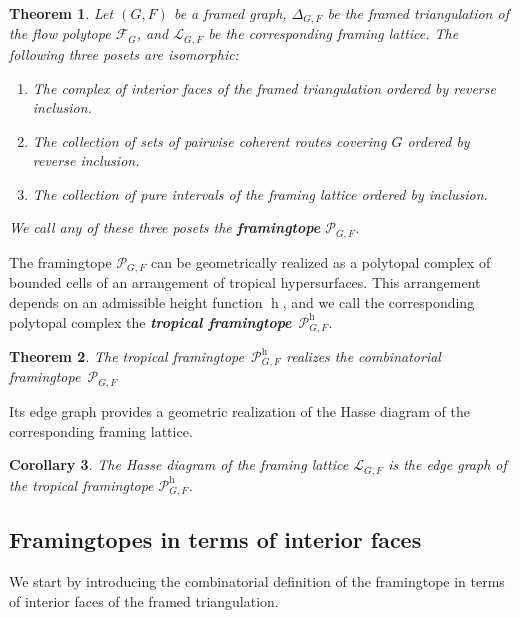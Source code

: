 \documentclass[12pt, reqno]{amsart}
\newcommand{\defn}[1]{{\color{blue!50!black}\textbf{\emph{#1}}}}
\newcommand{\h}{\operatorname{h}}
\theoremstyle{plain}
\newtheorem{theorem}{Theorem}[section]
\newtheorem{corollary}[theorem]{Corollary}
\theoremstyle{definition}
\numberwithin{equation}{section}
\begin{document}
\begin{theorem}
    \label{thm.three_equivalent_definitions}
    Let $(G,F)$ be a framed graph, $\Delta_{G,F}$ be the framed triangulation of the flow polytope $\mathcal{F}_G$, and $\mathscr{L}_{G,F}$ be the corresponding framing lattice. The following three posets are isomorphic:
    \begin{enumerate}
        \item The complex of interior faces of the framed triangulation ordered by reverse inclusion. \label{def_framingtope_one}
        \item The collection of sets of pairwise coherent routes covering $G$ ordered by reverse inclusion. \label{def_framingtope_two}
        \item The collection of pure intervals of the framing lattice ordered by inclusion. \label{def_framingtope_three}
        
    \end{enumerate}
    We call any of these three posets the \defn{framingtope} $\mathscr{P}_{G,F}$.
\end{theorem}


The framingtope $\mathscr{P}_{G,F}$ can be geometrically realized as a polytopal complex of bounded cells of an arrangement of tropical hypersurfaces. This arrangement depends on an admissible height function $\h$, and we call the corresponding polytopal complex the \defn{tropical framingtope}~$\mathscr{P}_{G,F}^{\h}$.

\begin{theorem}\label{thm_framingtope_geometric_realization}
    The tropical framingtope~$\mathscr{P}_{G,F}^{\h}$ realizes the combinatorial framingtope~$\mathscr{P}_{G,F}$
\end{theorem}

Its edge graph provides a geometric realization of the Hasse diagram of the corresponding framing lattice.


\begin{corollary}
    The Hasse diagram of the framing lattice $\mathscr{L}_{G,F}$ is the edge graph of the tropical framingtope $\mathscr{P}_{G,F}^{\h}$.
\end{corollary}

\subsection{Framingtopes in terms of interior faces}
\label{sec_framiingtope_interior}

We start by introducing the combinatorial definition of the framingtope in terms of interior faces of the framed triangulation.
\end{document}
